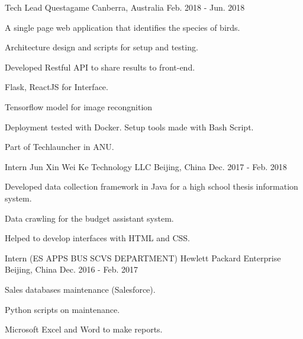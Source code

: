\begin{cventries}
  \cventry
    {Tech Lead} %
    {Questagame} %
    {Canberra, Australia} %
    {Feb. 2018 - Jun. 2018} %
    {
      \begin{cvitems} %
        \item {A single page web application that identifies the species of birds.}
        \item {Architecture design and scripts for setup and testing.}
        \item {Developed Restful API to share results to front-end.}
        \item {Flask, ReactJS for Interface.}
        \item {Tensorflow model for image recongnition}
        \item {Deployment tested with Docker. Setup tools made with Bash Script.}
        \item {Part of Techlauncher in ANU.}
      \end{cvitems}
    }

  \cventry
    {Intern} %
    {Jun Xin Wei Ke Technology LLC} %
    {Beijing, China} %
    {Dec. 2017 - Feb. 2018} %
    {
      \begin{cvitems} %
        \item {Developed data collection framework in Java for a high school thesis information system.}
        \item {Data crawling for the budget assistant system.}
        \item {Helped to develop interfaces with HTML and CSS.}
      \end{cvitems}
    }

  \cventry
    {Intern (ES APPS BUS SCVS DEPARTMENT)} %
    {Hewlett Packard Enterprise} %
    {Beijing, China} %
    {Dec. 2016 - Feb. 2017} %
    {
      \begin{cvitems} %
        \item {Sales databases maintenance (Salesforce).}
        \item {Python scripts on maintenance.}
        \item {Microsoft Excel and Word to make reports.}
      \end{cvitems}
    }

  
\end{cventries}
